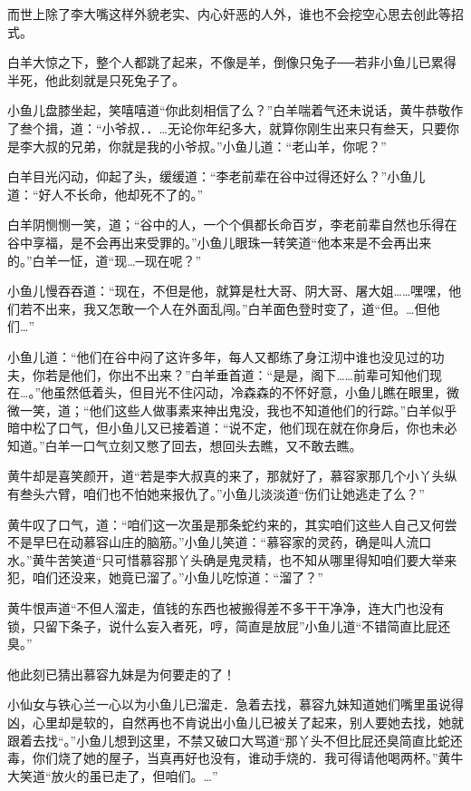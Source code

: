 \documentclass[12pt,oneside]{book}
\begin{document}
而世上除了李大嘴这样外貌老实、内心奸恶的人外，谁也不会挖空心思去创此等招式。

白羊大惊之下，整个人都跳了起来，不像是羊，倒像只兔子──若非小鱼儿已累得半死，他此刻就是只死兔子了。

小鱼儿盘膝坐起，笑嘻嘻道``你此刻相信了么？''白羊喘着气还未说话，黄牛恭敬作了叁个揖，道：``小爷叔．．\ldots 无论你年纪多大，就算你刚生出来只有叁天，只要你是李大叔的兄弟，你就是我的小爷叔。''小鱼儿道：``老山羊，你呢？''

白羊目光闪动，仰起了头，缓缓道：``李老前辈在谷中过得还好么？''小鱼儿道：``好人不长命，他却死不了的。''

白羊阴恻恻一笑，道；``谷中的人，一个个俱都长命百岁，李老前辈自然也乐得在谷中享福，是不会再出来受罪的。''小鱼儿眼珠一转笑道``他本来是不会再出来的。''白羊一怔，道``现\ldots─现在呢？''

小鱼儿慢吞吞道：``现在，不但是他，就算是杜大哥、阴大哥、屠大姐\ldots\ldots 嘿嘿，他们若不出来，我又怎敢一个人在外面乱闯。''白羊面色登时变了，道``但。\ldots 但他们\ldots{}''

小鱼儿道：``他们在谷中闷了这许多年，每人又都练了身江沏中谁也没见过的功夫，你若是他们，你出不出来？''白羊垂首道：``是是，阁下\ldots\ldots 前辈可知他们现在\ldots。''他虽然低着头，但目光不住闪动，冷森森的不怀好意，小鱼儿瞧在眼里，微微一笑，道；``他们这些人做事素来神出鬼没，我也不知道他们的行踪。''白羊似乎暗中松了口气，但小鱼儿又已接着道：``说不定，他们现在就在你身后，你也未必知道。''白羊一口气立刻又憋了回去，想回头去瞧，又不敢去瞧。

黄牛却是喜笑颜开，道``若是李大叔真的来了，那就好了，慕容家那几个小丫头纵有叁头六臂，咱们也不怕她来报仇了。''小鱼儿淡淡道``伤们让她逃走了么？''

黄牛叹了口气，道：``咱们这一次虽是那条蛇约来的，其实咱们这些人自己又何尝不是早巳在动慕容山庄的脑筋。''小鱼儿笑道：``慕容家的灵药，确是叫人流口水。''黄牛苦笑道``只可惜慕容那丫头确是鬼灵精，也不知从哪里得知咱们要大举来犯，咱们还没来，她竟已溜了。''小鱼儿吃惊道：``溜了？''

黄牛恨声道``不但人溜走，值钱的东西也被搬得差不多干干净净，连大门也没有锁，只留下条子，说什么妄入者死，哼，简直是放屁''小鱼儿道``不错简直比屁还臭。''

他此刻已猜出慕容九妹是为何要走的了！

小仙女与铁心兰一心以为小鱼儿已溜走．急着去找，慕容九妹知道她们嘴里虽说得凶，心里却是软的，自然再也不肯说出小鱼儿已被关了起来，别人要她去找，她就跟着去找``。''小鱼儿想到这里，不禁又破口大骂道``那丫头不但比屁还臭简直比蛇还毒，你们烧了她的屋子，当真再好也没有，谁动手烧的．我可得请他喝两杯。''黄牛大笑道``放火的虽已走了，但咱们。\ldots{}''
\end{document}
